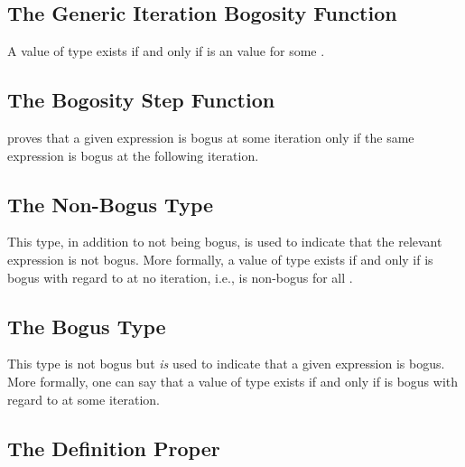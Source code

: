 \documentclass{report}
\begin{document}
\subsection{The Generic Iteration Bogosity Function}
A value of type    exists if and only if     is an  value for some .

\subsection{The Bogosity Step Function}
 proves that a given expression is bogus at some iteration only if the same expression is bogus at the following iteration.

\subsection{The Non-Bogus Type}
This type, in addition to not being bogus, is used to indicate that the relevant expression is not bogus.  More formally, a value of type    exists if and only if  is bogus with regard to   at no iteration, i.e.,     is non-bogus for all .

\subsection{The Bogus Type}
This type is not bogus but \emph{is} used to indicate that a given expression is bogus.  More formally, one can say that a value of type    exists if and only if  is bogus with regard to   at some iteration.

\subsection{The Definition Proper}
\end{document}
